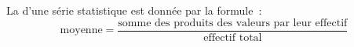 La  d'une série statistique est donnée par la formule~:
$$\text{moyenne}=\dfrac{\text{somme des produits des valeurs par leur effectif}}
{\text{effectif total}}$$